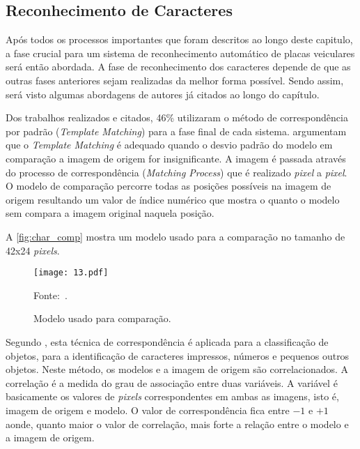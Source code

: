 \subsection{\textbf{Reconhecimento de Caracteres}}

Após todos os processos importantes que foram descritos ao longo deste capitulo, a fase crucial para um sistema de reconhecimento automático de placas veiculares será então abordada. A fase de reconhecimento dos caracteres depende de que as outras fases anteriores sejam realizadas da melhor forma possível. Sendo assim, será visto algumas abordagens de autores já citados ao longo do capítulo.

Dos trabalhos realizados e citados, 46\% utilizaram o método de correspondência por padrão (\textit{Template Matching}) para a fase final de cada sistema. \cite{agarwal2016} argumentam que o \textit{Template Matching} é adequado quando o desvio padrão do modelo em comparação a imagem de origem for insignificante. A imagem é passada através do processo de correspondência (\textit{Matching Process}) que é realizado \emph{pixel} a \emph{pixel}. O modelo de comparação percorre todas as posições possíveis na imagem de origem resultando um valor de índice numérico que mostra o quanto o modelo sem compara a imagem original naquela posição.

A \autoref{fig:char_comp} mostra um modelo usado para a comparação no tamanho de 42x24 \emph{pixels}.

\begin{figure}[htb]
	\centering
	\caption{{\footnotesize Modelo usado para comparação.}}   %
	\label{fig:char_comp}
	\texttt{[image: 13.pdf]}
	
	{\footnotesize Fonte:~.}
\end{figure}

Segundo , esta técnica de correspondência é aplicada para a classificação de objetos, para a identificação de caracteres impressos, números e pequenos outros objetos. Neste método, os modelos e a imagem de origem são correlacionados. A correlação é a medida do grau de associação entre duas variáveis. A variável é basicamente os valores de \emph{pixels} correspondentes em ambas as imagens, isto é, imagem de origem e modelo. O valor de correspondência fica entre $-1$ e $+1$ aonde, quanto maior o valor de correlação, mais forte a relação entre o modelo e a imagem de origem.

